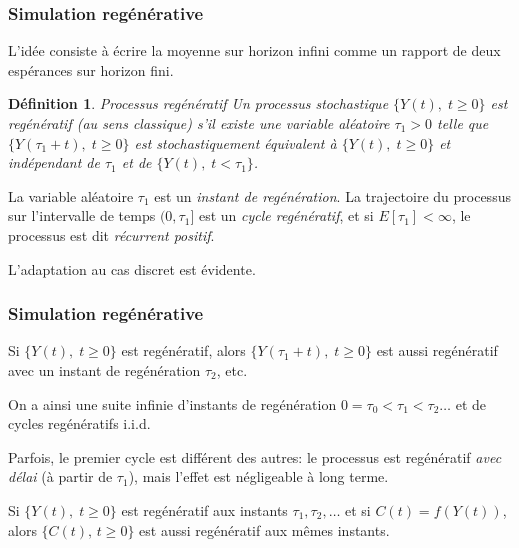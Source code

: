 \documentclass[t,usepdftitle=false]{beamer}
\def\iid{i.i.d.}
\newtheorem{defn}{Définition}
\begin{document}
\begin{frame}
\frametitle{Simulation regénérative}

L'idée consiste à écrire la moyenne sur horizon infini comme un rapport
de deux espérances sur horizon fini.

\mbox{}

\begin{defn}{Processus regénératif}
Un processus stochastique $\{{Y(t)},\; t\ge 0\}$ 
est \emph{regénératif} (au sens classique) s'il existe
une variable aléatoire ${\tau_1} > 0$ telle que 
$\{Y(\tau_1+t),\; t\ge 0\}$ est stochastiquement équivalent à
$\{Y(t),\; t\ge 0\}$ et indépendant de $\tau_1$ et de 
$\{Y(t),\; t<\tau_1\}$.
\end{defn}

La variable aléatoire $\tau_1$ est un \emph{instant de regénération}.
La trajectoire du processus sur l'intervalle de temps $(0,\tau_1]$
est un \emph{cycle regénératif}, et si $E[\tau_1] < \infty$, le processus est dit \emph{récurrent positif}.

\mbox{}

L'adaptation au cas discret est évidente.

\end{frame}

\begin{frame}
\frametitle{Simulation regénérative}

Si $\{Y(t),\; t\ge 0\}$ est regénératif, alors 
$\{Y(\tau_1+t),\; t\ge 0\}$ est aussi regénératif avec un
instant de regénération ${\tau_2}$, etc.

\mbox{}

On a ainsi une suite infinie d'instants de regénération
$0 =\tau_0 < \tau_1 < \tau_2 \dots$ et de cycles regénératifs \iid

\mbox{}

Parfois, le premier cycle est différent des autres:
le processus est regénératif \emph{avec délai}
(à partir de $\tau_1$), mais l'effet est négligeable à long terme.

\mbox{}

Si $\{Y(t),\; t\ge 0\}$ est regénératif aux instants 
$\tau_1,\tau_2,\dots$ et si ${C(t)} = f(Y(t))$, alors
$\{C(t),\, t\ge 0\}$ est aussi regénératif aux mêmes instants.

\end{frame}
\end{document}
